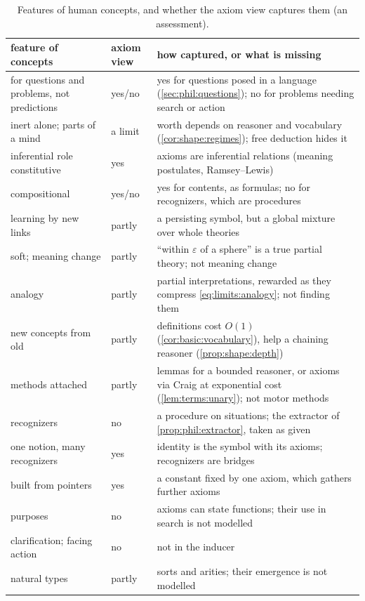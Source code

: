 \begin{table}[t]
\crefabbrev
\centering\footnotesize
\renewcommand{\arraystretch}{1.03}
\begin{tabularx}{\textwidth}{@{}p{}p{}X@{}}
\toprule
feature of concepts & axiom view & how captured, or what is missing \\
\midrule
for questions and problems, not predictions & yes/no & yes for questions posed in a language (\cref{sec:phil:questions}); no for problems needing search or action \\
inert alone; parts of a mind & a limit & worth depends on reasoner and vocabulary (\cref{cor:shape:regimes}); free deduction hides it \\
inferential role constitutive & yes & axioms are inferential relations (meaning postulates, Ramsey--Lewis) \\
compositional & yes/no & yes for contents, as formulas; no for recognizers, which are procedures \\
learning by new links & partly & a persisting symbol, but a global mixture over whole theories \\
soft; meaning change & partly & ``within $\varepsilon$ of a sphere'' is a true partial theory; not meaning change \\
analogy & partly & partial interpretations, rewarded as they compress \eqref{eq:limits:analogy}; not finding them \\
new concepts from old & partly & definitions cost $O(1)$ (\cref{cor:basic:vocabulary}), help a chaining reasoner (\cref{prop:shape:depth}) \\
methods attached & partly & lemmas for a bounded reasoner, or axioms via Craig at exponential cost (\cref{lem:terms:unary}); not motor methods \\
recognizers & no & a procedure on situations; the extractor of \cref{prop:phil:extractor}, taken as given \\
one notion, many recognizers & yes & identity is the symbol with its axioms; recognizers are bridges \\
built from pointers & yes & a constant fixed by one axiom, which gathers further axioms \\
purposes & no & axioms can state functions; their use in search is not modelled \\
clarification; facing action & no & not in the inducer \\
natural types & partly & sorts and arities; their emergence is not modelled \\
\bottomrule
\end{tabularx}
\caption{Features of human concepts, and whether the axiom view captures them (an assessment).}
\label{tab:limits:concepts}
\end{table}

